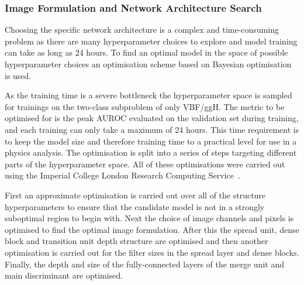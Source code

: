 \subsubsection{Image Formulation and Network Architecture Search}
Choosing the specific network architecture is a complex and time-consuming problem as there are many hyperparameter choices to explore and model training can take as long as 24 hours.
To find an optimal model in the space of possible hyperparameter choices an optimisation scheme based on Bayesian optimisation is used. 


As the training time is a severe bottleneck the hyperparameter space is sampled for trainings on the two-class subproblem of only VBF/ggH. 
The metric to be optimised for is the peak AUROC evaluated on the validation set during training, and each training can only take a maximum of 24 hours. 
This time requirement is to keep the model size and therefore training time to a practical level for use in a physics analysis.  
The optimisation is split into a series of steps targeting different parts of the hyperparameter space.
All of these optimisations were carried out using the Imperial College London Research Computing Service~\cite{IC_HPC}.

First an approximate optimisation is carried out over all of the structure hyperparameters to ensure that the candidate model is not in a strongly suboptimal region to begin with. 
Next the choice of image channels and pixels is optimised to find the optimal image formulation. After this the spread unit, dense block and transition unit depth structure are optimised and then another optimisation is carried out for the filter sizes in the spread layer and dense blocks. Finally, the depth and size of the fully-connected layers of the merge unit and main discriminant are optimised. 

